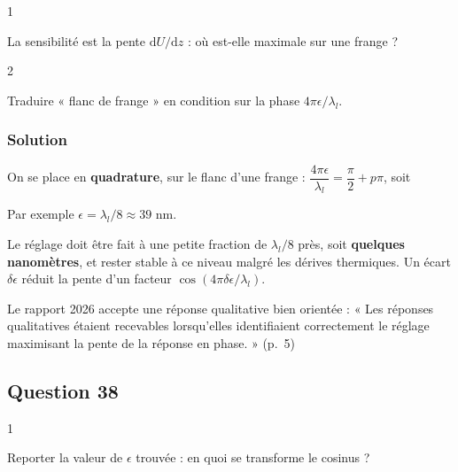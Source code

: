 \documentclass[11pt,a4paper]{article}
\newcommand{\equationajustee}[1]{%
  \sbox{\boiteequation}{$\displaystyle #1$}%
  \ifdim\wd\boiteequation>\linewidth
    \[\resizebox{\linewidth}{!}{\usebox{\boiteequation}}\]%
  \else
    \[#1\]%
  \fi}
\begin{document}
\begin{indication}{1}

La sensibilité est la pente \(\mathrm{d}U/\mathrm{d}z\) : où est-elle maximale sur une frange ?

\end{indication}

\begin{indication}{2}

Traduire « flanc de frange » en condition sur la phase \(4\pi\epsilon/\lambda_l\).

\end{indication}

\hypertarget{solution-36}{%
\subsubsection{Solution}\label{solution-36}}

On se place en \textbf{quadrature}, sur le flanc d'une frange : \(\dfrac{4\pi\epsilon}{\lambda_l}=\dfrac\pi2+p\pi\), soit

\equationajustee{\boxed{\epsilon=\frac{\lambda_l}{8}+p\frac{\lambda_l}{4},\ p\in\mathbb{Z}}}

Par exemple \(\epsilon=\lambda_l/8\approx39\) nm.

Le réglage doit être fait à une petite fraction de \(\lambda_l/8\) près, soit \textbf{quelques nanomètres}, et rester stable à ce niveau malgré les dérives thermiques. Un écart \(\delta\epsilon\) réduit la pente d'un facteur \(\cos(4\pi\delta\epsilon/\lambda_l)\).

\begin{jury}

Le rapport 2026 accepte une réponse qualitative bien orientée : « Les réponses qualitatives étaient recevables lorsqu'elles identifiaient correctement le réglage maximisant la pente de la réponse en phase. » (p.~5)

\end{jury}

\hypertarget{question-38}{%
\subsection{Question 38}\label{question-38}}

\begin{indication}{1}

Reporter la valeur de \(\epsilon\) trouvée : en quoi se transforme le cosinus ?

\end{indication}
\end{document}
